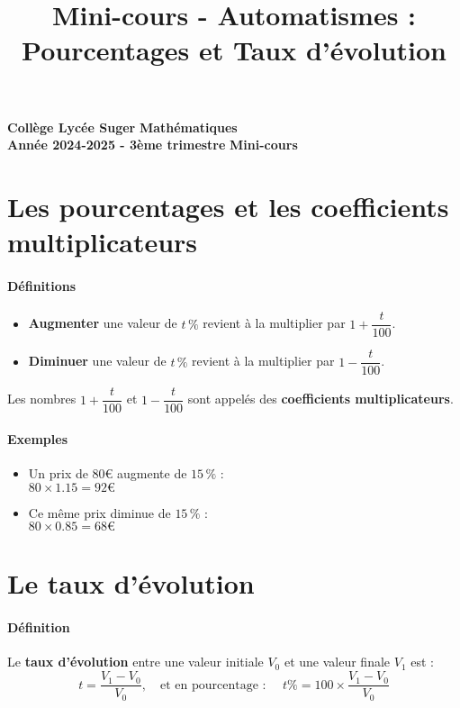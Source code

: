 \documentclass[answers]{exam}
\title{Mini-cours - Automatismes : Pourcentages et Taux d'évolution}
\begin{document}
\textbf{Collège Lycée Suger}
\hfill
\textbf{Mathématiques} \\

\textbf{Année 2024-2025 - 3ème trimestre}
\hfill
\textbf{Mini-cours} \par

{\let\newpage\relax\maketitle}

\section*{Les pourcentages et les coefficients multiplicateurs}


\paragraph{Définitions}
\begin{itemize}
    \item \textbf{Augmenter} une valeur de $t\,\%$ revient à la multiplier par $\boxed{1 + \dfrac{t}{100}}$.
    \item \textbf{Diminuer} une valeur de $t\,\%$ revient à la multiplier par $\boxed{1 - \dfrac{t}{100}}$.
\end{itemize}
Les nombres $1 + \dfrac{t}{100}$ et $1 - \dfrac{t}{100}$ sont appelés des \textbf{coefficients multiplicateurs}.

\paragraph{Exemples}
\begin{itemize}
    \item Un prix de 80€ augmente de $15\,\%$ : \\
    $80 \times 1.15 = \boxed{92\text{€}}$
    \item Ce même prix diminue de $15\,\%$ : \\
    $80 \times 0.85 = \boxed{68\text{€}}$
\end{itemize}

\section*{Le taux d'évolution}

\paragraph{Définition}
Le \textbf{taux d'évolution} entre une valeur initiale $V_0$ et une valeur finale $V_1$ est :
\[
t = \dfrac{V_1 - V_0}{V_0}, \quad \text{et en pourcentage : } \quad t\% = 100 \times \dfrac{V_1 - V_0}{V_0}
\]
\end{document}
